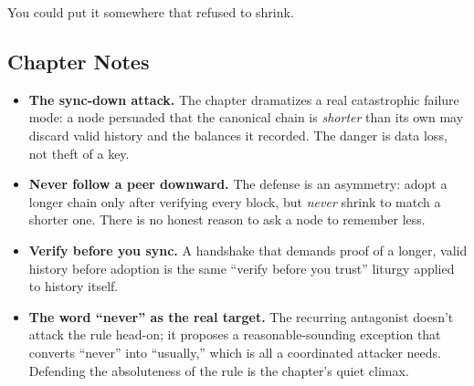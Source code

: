 You could put it somewhere that refused to shrink.

\hypertarget{chapter-13-notes}{%
\subsection{Chapter Notes}\label{chapter-13-notes}}

\begin{itemize}
\tightlist
\item
  \textbf{The sync-down attack.} The chapter dramatizes a real catastrophic
  failure mode: a node persuaded that the canonical chain is \emph{shorter} than
  its own may discard valid history and the balances it recorded. The danger is
  data loss, not theft of a key.
\item
  \textbf{Never follow a peer downward.} The defense is an asymmetry: adopt a
  longer chain only after verifying every block, but \emph{never} shrink to match
  a shorter one. There is no honest reason to ask a node to remember less.
\item
  \textbf{Verify before you sync.} A handshake that demands proof of a longer,
  valid history before adoption is the same ``verify before you trust'' liturgy
  applied to history itself.
\item
  \textbf{The word ``never'' as the real target.} The recurring antagonist
  doesn't attack the rule head-on; it proposes a reasonable-sounding exception
  that converts ``never'' into ``usually,'' which is all a coordinated attacker
  needs. Defending the absoluteness of the rule is the chapter's quiet climax.
\end{itemize}
